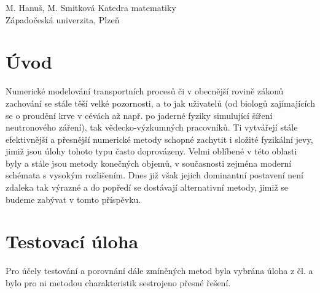\documentclass{sna}
\begin{document}
     {M. Hanuš, M. Smitková}
     {Katedra matematiky \\ Západočeská univerzita, Plzeň}

\section{Úvod}

Numerické modelování transportních procesů či v obecnější rovině zákonů zachování se stále těší velké pozornosti, a to jak uživatelů 
(od biologů zajímajících se o proudění krve v cévách až např. po jaderné fyziky simulující šíření neutronového záření), tak vědecko-výzkumných pracovníků. Ti vytvářejí stále efektivnější a přesnější numerické metody schopné zachytit i složité fyzikální jevy, jimiž jsou úlohy tohoto typu často doprovázeny. Velmi oblíbené v této oblasti byly a stále jsou metody konečných objemů, v současnosti zejména moderní schémata s vysokým rozlišením. Dnes již však jejich dominantní postavení není zdaleka tak výrazné a do popředí se dostávají alternativní metody, jimiž se budeme zabývat v tomto příspěvku.

\section{Testovací úloha}

Pro účely testování a porovnání dále zmíněných metod byla vybrána úloha z čl. \cite{Houston} a bylo pro ni metodou charakteristik sestrojeno přesné řešení.
\end{document}
